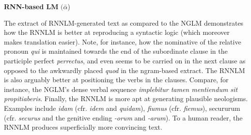\documentclass[11pt]{article}
\begin{document}
\noindent \textbf{RNN-based LM} $(\bar{\alpha}$)
\begin{exe}
\end{exe}

\noindent The extract of RNNLM-generated text as compared to the NGLM demonstrates how the RNNLM is better at reproducing a syntactic logic (which moreover makes translation easier). Note, for instance, how the nominative of the relative pronoun \textit{qui} is maintained towards the end of the subordinate clause in the participle perfect \textit{perrectus}, and even seems to be carried on in the next clause as opposed to the awkwardly placed \textit{quod} in the ngram-based extract. The RNNLM is also arguably better at positioning the verbs in the clauses. Compare, for instance, the NGLM's dense verbal sequence \textit{implebitur tamen mentiendum sit propitiaberis}. Finally, the RNNLM is more apt at generating plausible neologisms. Examples include \textit{idam} (cfr. \textit{idem} and \textit{quidam}), \textit{fiumus} (cfr. \textit{fiemus}), secururum (cfr. \textit{securus} and the genitive ending \textit{-orum} and \textit{-arum}). To a human reader, the RNNLM produces superficially more convincing text.
\end{document}
